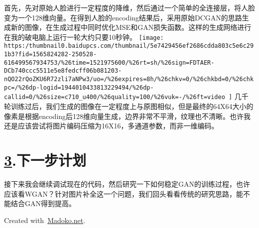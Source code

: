 \documentclass{article}
\begin{document}
\noindent{}首先，先对原始人脸进行一定程度的降维，然后通过一个简单的全连接层，将人脸变为一个128维向量。在得到人脸的encoding结果后，采用原始DCGAN的思路生成新的图像，在生成过程中同时优化MSE和GAN损失函数。这样的生成网络进行在我的破电脑上运行一轮大约只要10秒钟。
\texttt{[image: https:/thumbnail0.baidupcs.com/thumbnail/5e7429456ef2686cdda803c5e6c291b3?fid=1565824282-250528-616499567934753/\%26time=1521975600/\%26rt=sh/\%26sign=FDTAER-DCb740ccc5511e5e8fedcff06b081203-nQO22rQoZKU6R72zli7aNPw3/uo=/\%26expires=8h/\%26chkv=0/\%26chkbd=0/\%26chkpc=/\%26dp-logid=1944010433813229494/\%26dp-callid=0/\%26size=c710\_u400/\%26quality=100/\%26vuk=-/\%26ft=video
]}{}
几千轮训练过后，我们生成的图像在一定程度上与原图相似，但是最终的64X64大小的像素是根据encoding后128维向量生成，边界非常不平滑，纹理也不清晰。也许我还是应该尝试将图片编码压缩为16X16，多通道参数，而非一维编码。%

\section{\href{https://thumbnail0.baidupcs.com/thumbnail/486bd77e4df82bffa5ff9ee27bc1cdf6?fid=1565824282-250528-588930035273099\%26time=1521975600\%26rt=sh\%26sign=FDTAER-DCb740ccc5511e5e8fedcff06b081203-egyxTNPO3YAOpKBcqdgIkJoOKA4=\%26expires=8h\%26chkv=0\%26chkbd=0\%26chkpc=\%26dp-logid=1943754308764616556\%26dp-callid=0\%26size=c710_u400\%26quality=100\%26vuk=-\%26ft=video}{3}.\hspace*{0.5em}下一步计划}\label{section}%

\noindent{}接下来我会继续调试现在的代码，然后研究一下如何稳定GAN的训练过程，也许应该看WGAN？针对图片补全这一个问题，我们回头看看传统的研究思路，能不能结合GAN得到提高。%

\begin{mdbmargintb}{4em}{}%
\begin{mdflushright}%
{\tiny{}Created with~\href{https://www.madoko.net}{Madoko.net}.}%
\end{mdflushright}%
\end{mdbmargintb}%
\end{document}
